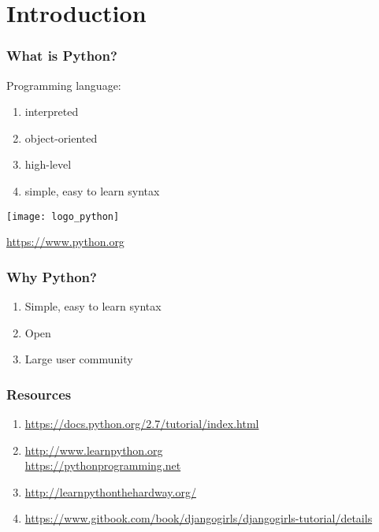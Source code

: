 \section{Introduction}


\begin{frame}
\frametitle{}

\end{frame}

\begin{frame}
\frametitle{What is Python?}

Programming language:
\begin{enumerate}
\item interpreted 
\item object-oriented 
\item high-level 
\item simple, easy to learn syntax
\end{enumerate}

\vfill

\texttt{[image: logo\_python]}


\url{https://www.python.org}

\end{frame}

\begin{frame}
\frametitle{Why Python?}

\begin{enumerate}
\item Simple, easy to learn syntax
\item Open
\item Large user community 
\end{enumerate}

\end{frame}

\begin{frame}
\frametitle{Resources}

\begin{enumerate}
\item \url{https://docs.python.org/2.7/tutorial/index.html}
\item \url{http://www.learnpython.org} \\
\url{https://pythonprogramming.net}
\item \url{http://learnpythonthehardway.org/} 
\item \url{https://www.gitbook.com/book/djangogirls/djangogirls-tutorial/details} 
\end{enumerate}

\end{frame}

